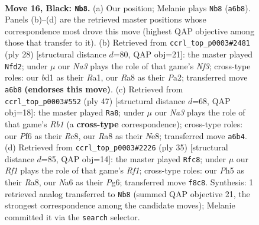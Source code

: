 \documentclass[11pt]{article}
\begin{document}
\clearpage

\begin{figure}[p]\centering
\begin{subfigure}{0.46\textwidth}\centering
\resizebox{\linewidth}{!}{%
\newchessgame
\chessboard[
  setfen={r4r2/pppb1kb1/n4pp1/4p2p/2P1P3/2N1BN2/PP3PP1/1R1BK1R1 b - - 3 16},
  showmover=false,
  pgfstyle=straightmove, color=movearrow, markmove={a6-b8}
]}
\caption{}
\end{subfigure}\hfill
\begin{subfigure}{0.46\textwidth}\centering
\resizebox{\linewidth}{!}{%
\newchessgame
\chessboard[
  setfen={r1r1b1k1/pp2bppp/2n1pn2/2P5/8/1N3NP1/PB2PPBP/R2R2K1 w - - 1 15},
  showmover=false,
  pgfstyle=straightmove, color=movearrow, markmove={f3-d2}
]}
\caption{}
\end{subfigure}
\\[4pt]
\begin{subfigure}{0.46\textwidth}\centering
\resizebox{\linewidth}{!}{%
\newchessgame
\chessboard[
  setfen={1rr1nbk1/1p1b3p/1p2ppp1/n7/3PN1P1/P2B1N1P/1P1B1P2/1R1R2K1 b - - 0 24},
  showmover=false,
  pgfstyle=straightmove, color=movearrow, markmove={b8-a8}
]}
\caption{}
\end{subfigure}\hfill
\begin{subfigure}{0.46\textwidth}\centering
\resizebox{\linewidth}{!}{%
\newchessgame
\chessboard[
  setfen={r4rk1/p2b1pbp/p5p1/2BPp3/1P2P1n1/2N2N2/P5PP/1R3RK1 b - - 1 18},
  showmover=false,
  pgfstyle=straightmove, color=movearrow, markmove={f8-c8}
]}
\caption{}
\end{subfigure}
\caption{\textbf{Move 16, Black: \texttt{Nb8}.} (a) Our position; Melanie plays \texttt{Nb8} (\texttt{a6b8}). Panels (b)--(d) are the retrieved master positions whose correspondence most drove this move (highest QAP objective among those that transfer to it). (b) Retrieved from \texttt{ccrl\_top\_p0003\#2481} (ply 28) [structural distance $d$=80, QAP obj=21]: the master played \texttt{Nfd2}; under $\mu$ our \emph{Na3} plays the role of that game's \emph{Nf3}; cross-type roles: our \emph{b}d1 as their \emph{R}a1, our \emph{R}a8 as their \emph{P}a2; transferred move \texttt{a6b8} \textbf{(endorses this move)}. (c) Retrieved from \texttt{ccrl\_top\_p0003\#552} (ply 47) [structural distance $d$=68, QAP obj=18]: the master played \texttt{Ra8}; under $\mu$ our \emph{Na3} plays the role of that game's \emph{Rb1} (a \textbf{cross-type} correspondence); cross-type roles: our \emph{P}f6 as their \emph{R}c8, our \emph{R}a8 as their \emph{N}e8; transferred move \texttt{a6b4}. (d) Retrieved from \texttt{ccrl\_top\_p0003\#2226} (ply 35) [structural distance $d$=85, QAP obj=14]: the master played \texttt{Rfc8}; under $\mu$ our \emph{Rf1} plays the role of that game's \emph{Rf1}; cross-type roles: our \emph{P}h5 as their \emph{R}a8, our \emph{N}a6 as their \emph{P}g6; transferred move \texttt{f8c8}. Synthesis: 1 retrieved analog transferred to \texttt{Nb8} (summed QAP objective 21, the strongest correspondence among the candidate moves); Melanie committed it via the \texttt{search} selector.}
\label{fig:thought-m31}
\end{figure}
\end{document}
